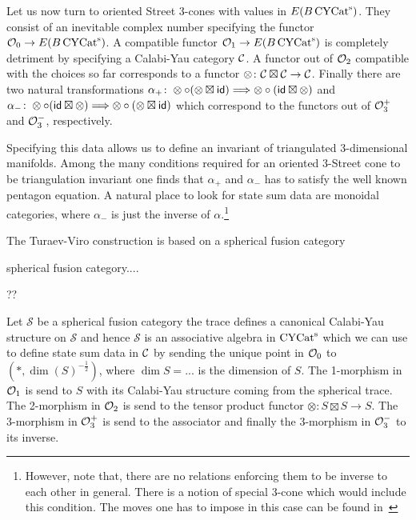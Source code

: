 Let us now turn to oriented Street 3-cones with values in $E(B\operatorname{\mathrm{CYCat}^s})$. They consist of an inevitable complex number specifying the functor $\mathcal{O}_0 \to E(B\operatorname{\mathrm{CYCat}^s})$. A compatible functor $\mathcal{O}_1 \to E(B\operatorname{\mathrm{CYCat}^s})$ is completely detriment by specifying a Calabi-Yau category $\mathcal{C}$. A functor out of $\mathcal{O}_2$ compatible with the choices so far corresponds to a functor $\otimes \colon \mathcal{C} \boxtimes \mathcal{C} \to \mathcal{C}$. Finally there are two natural transformations $\alpha_+\colon \otimes \circ (\otimes \boxtimes \mathsf{id} ) \Longrightarrow \otimes \circ (\mathsf{id} \boxtimes \otimes )$ and $\alpha_-\colon \otimes \circ (\mathsf{id} \boxtimes \otimes ) \Longrightarrow \otimes \circ (\otimes \boxtimes \mathsf{id} )$ which correspond to the functors out of $\mathcal{O}_3^+$ and $\mathcal{O}_3^-$, respectively.    

Specifying this data allows us to define an invariant of triangulated 3-dimensional manifolds. Among the many conditions required for an oriented 3-Street cone to be triangulation invariant one finds that $\alpha_+$ and $\alpha_-$ has to satisfy the well known pentagon equation. A natural place to look for state sum data are monoidal categories, where $\alpha_-$ is just the inverse of $\alpha$.\footnote{However, note that, there are no relations enforcing them to be inverse to each other in general. There is a notion of special 3-cone which would include this condition. The moves one has to impose in this case can be found in~\cite[Section 3.4]{carqueville2016orbifoldcompletion}}  

The Turaev-Viro construction is based on a spherical fusion category
\begin{definition}
    spherical fusion category....
\end{definition}
\begin{example}
    ??
\end{example}
Let $\mathcal{S}$ be a spherical fusion category the trace defines a canonical Calabi-Yau structure on $\mathcal{S}$ and hence $\mathcal{S}$ is an associative algebra in $\operatorname{\mathrm{CYCat}^s}$ which we can use to define state sum data in $\mathcal{C}$ by sending the unique point in $\mathcal{O}_0$ to $(*,\dim (S)^{-\tfrac{1}{2}})$, where $\dim S = ...$ is the dimension of $S$. The 1-morphism in $\mathcal{O}_1$ is send to $S$ with its Calabi-Yau structure coming from the spherical trace. The 2-morphism in $\mathcal{O}_2$ is send to the tensor product functor $\otimes \colon S\boxtimes S \to S$. The 3-morphism in $\mathcal{O}_3^+$ is send to the associator and finally the 3-morphism in $\mathcal{O}_3^-$ to its inverse.